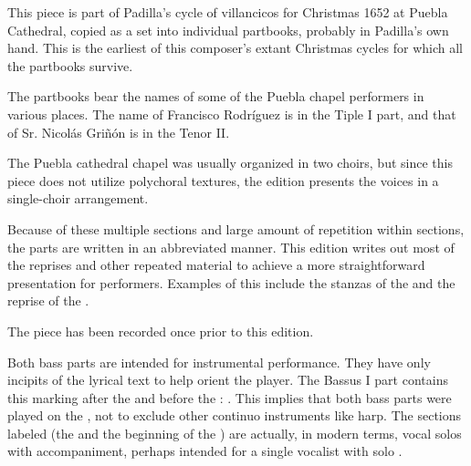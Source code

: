 
\begin{notesources}

\begin{source}
\end{source}

\end{notesources}

This piece is part of Padilla's cycle of villancicos for Christmas 1652 at Puebla Cathedral, copied as a set into individual partbooks, probably in Padilla's own hand.
This is the earliest of this composer's extant Christmas cycles for which all the partbooks survive.

The partbooks bear the names of some of the Puebla chapel performers in various places.
The name of Francisco Rodríguez is in the Tiple I part, and that of Sr. Nicolás Griñón is in the Tenor II.

The Puebla cathedral chapel was usually organized in two choirs, but since this piece does not utilize polychoral textures, the edition presents the voices in a single-choir arrangement.

Because of these multiple sections and large amount of repetition within sections, the parts are written in an abbreviated manner.
This edition writes out most of the reprises and other repeated material to achieve a more straightforward presentation for performers.
Examples of this include the stanzas of the  and the  reprise of the .

The piece has been recorded once prior to this edition.%
  \autocite{Padilla:1652ChristmasCD}


Both bass parts are intended for instrumental performance.
They have only incipits of the lyrical text to help orient the player.
The Bassus I part contains this marking after the  and before the : .
This implies that both bass parts were played on the , not to exclude other continuo instruments like harp.
The sections labeled  (the  and the beginning of the ) are actually, in modern terms, vocal solos with accompaniment, perhaps intended for a single vocalist with solo .

